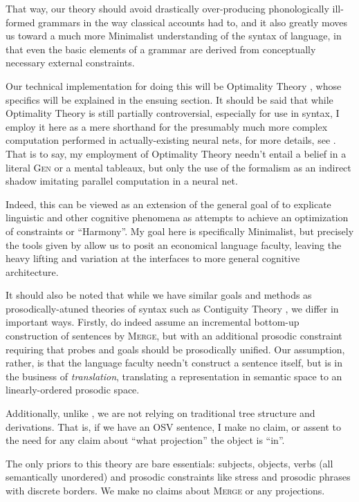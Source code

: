 \documentclass{article}
\begin{document}
That way, our theory should avoid drastically over-producing phonologically ill-formed grammars in the way classical accounts had to, and it also greatly moves us toward a much more Minimalist understanding of the syntax of language, in that even the basic elements of a grammar are derived from conceptually necessary external constraints.

Our technical implementation for doing this will be Optimality Theory \parencite{prince93}, whose specifics will be explained in the ensuing section.
It should be said that while Optimality Theory is still partially controversial, especially for use in syntax, I employ it here as a mere shorthand for the presumably much more complex computation performed in actually-existing neural nets, for more details, see \textcite{prince97}.
That is to say, my employment of Optimality Theory needn't entail a belief in a literal {\textsc{Gen}} or a mental tableaux, but only the use of the formalism as an indirect shadow imitating parallel computation in a neural net.

Indeed, this can be viewed as an extension of the general goal of \textcite{smolensky06} to explicate linguistic and other cognitive phenomena as attempts to achieve an optimization of constraints or ``Harmony''.
My goal here is specifically Minimalist, but precisely the tools given by \textcite{smolensky06} allow us to posit an economical language faculty, leaving the heavy lifting and variation at the interfaces to more general cognitive architecture.

It should also be noted that while we have similar goals and methods as prosodically-atuned theories of syntax such as Contiguity Theory \parencite{richards16}, we differ in important ways.
Firstly, \textcite{richards10,richards16} do indeed assume an incremental bottom-up construction of sentences by \textsc{Merge}, but with an additional prosodic constraint requiring that probes and goals should be prosodically unified.
Our assumption, rather, is that the language faculty needn't construct a sentence itself, but is in the business of \textit{translation}, translating a representation in semantic space to an linearly-ordered prosodic space.

Additionally, unlike \textcite{richards16}, we are not relying on traditional tree structure and derivations.
That is, if we have an OSV sentence, I make no claim, or assent to the need for any claim about ``what projection'' the object is ``in''.

The only priors to this theory are bare essentials: subjects, objects, verbs (all semantically unordered) and prosodic constraints like stress and prosodic phrases with discrete borders.
We make no claims about \textsc{Merge} or any projections.
\end{document}
